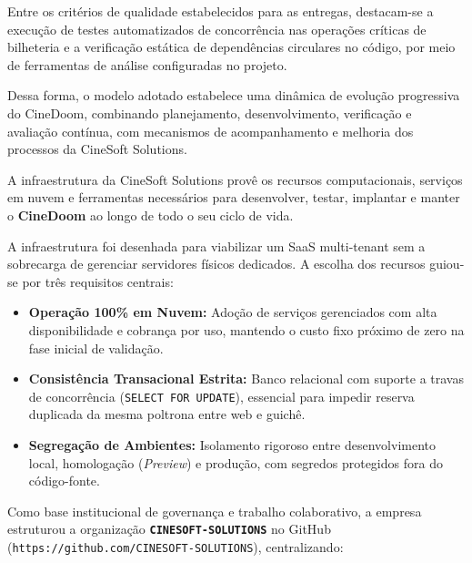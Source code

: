 Entre os critérios de qualidade estabelecidos para as entregas, destacam-se a execução de testes automatizados de concorrência nas operações críticas de bilheteria e a verificação estática de dependências circulares no código, por meio de ferramentas de análise configuradas no projeto.

Dessa forma, o modelo adotado estabelece uma dinâmica de evolução progressiva do CineDoom, combinando planejamento, desenvolvimento, verificação e avaliação contínua, com mecanismos de acompanhamento e melhoria dos processos da CineSoft Solutions.


A infraestrutura da CineSoft Solutions provê os recursos computacionais, serviços em nuvem e ferramentas necessários para desenvolver, testar, implantar e manter o \textbf{CineDoom} ao longo de todo o seu ciclo de vida.


A infraestrutura foi desenhada para viabilizar um SaaS multi-tenant sem a sobrecarga de gerenciar servidores físicos dedicados. A escolha dos recursos guiou-se por três requisitos centrais:

\begin{itemize}
\item \textbf{Operação 100\% em Nuvem:} Adoção de serviços gerenciados com alta disponibilidade e cobrança por uso, mantendo o custo fixo próximo de zero na fase inicial de validação.
\item \textbf{Consistência Transacional Estrita:} Banco relacional com suporte a travas de concorrência (\texttt{SELECT \allowbreak\hspace{0pt plus 1pt}FOR \allowbreak\hspace{0pt plus 1pt}UPDATE}), essencial para impedir reserva duplicada da mesma poltrona entre web e guichê.
\item \textbf{Segregação de Ambientes:} Isolamento rigoroso entre desenvolvimento local, homologação (\emph{Preview}) e produção, com segredos protegidos fora do código-fonte.
\end{itemize}


Como base institucional de governança e trabalho colaborativo, a empresa estruturou a organização \textbf{\texttt{CINESOFT-\allowbreak\hspace{0pt plus 1pt}SOLUTIONS}} no GitHub (\texttt{https:/\allowbreak\hspace{0pt plus 1pt}/\allowbreak\hspace{0pt plus 1pt}github.\allowbreak\hspace{0pt plus 1pt}com/\allowbreak\hspace{0pt plus 1pt}CINESOFT-\allowbreak\hspace{0pt plus 1pt}SOLUTIONS}), centralizando:

